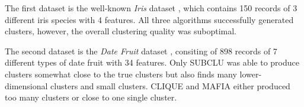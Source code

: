 The first dataset is the well-known \textit{Iris} dataset \cite{iris}, which contains 150 records of 3 different iris species with 4 features. All three algorithms successfully generated clusters, however, the overall clustering quality was suboptimal.

The second dataset is the \textit{Date Fruit} dataset \cite{date-fruit}, consiting of 898 records of 7 different types of date fruit with 34 features. Only SUBCLU was able to produce clusters somewhat close to the true clusters but also finds many lower-dimensional clusters and small clusters. CLIQUE and MAFIA either produced too many clusters or close to one single cluster.
